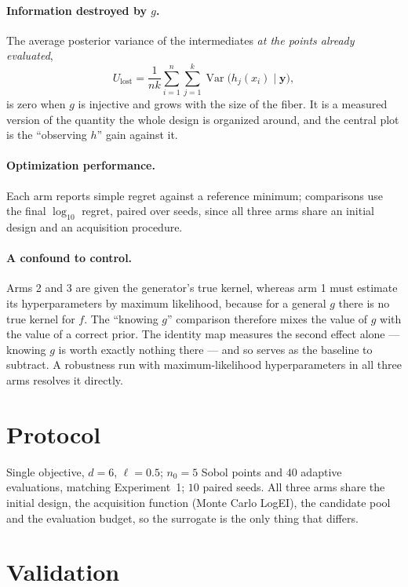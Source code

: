 \documentclass[11pt]{article}
\begin{document}
\paragraph{Information destroyed by $g$.} The average posterior variance of the
intermediates \emph{at the points already evaluated},
\begin{equation}
U_{\text{lost}}=\frac{1}{nk}\sum_{i=1}^{n}\sum_{j=1}^{k}
\operatorname{Var}\bigl(h_j(x_i)\mid \mathbf{y}\bigr),
\end{equation}
is zero when $g$ is injective and grows with the size of the fiber. It is a
measured version of the quantity the whole design is organized around, and the
central plot is the ``observing $h$'' gain against it.

\paragraph{Optimization performance.} Each arm reports simple regret against a
reference minimum; comparisons use the final $\log_{10}$ regret, paired over
seeds, since all three arms share an initial design and an acquisition
procedure.

\paragraph{A confound to control.} Arms 2 and 3 are given the generator's true
kernel, whereas arm 1 must estimate its hyperparameters by maximum likelihood,
because for a general $g$ there is no true kernel for $f$. The ``knowing $g$''
comparison therefore mixes the value of $g$ with the value of a correct prior.
The identity map measures the second effect alone --- knowing $g$ is worth
exactly nothing there --- and so serves as the baseline to subtract. A
robustness run with maximum-likelihood hyperparameters in all three arms
resolves it directly.

\section{Protocol}

Single objective, $d=6$, $\ell=0.5$; $n_0=5$ Sobol points and $40$ adaptive
evaluations, matching Experiment~1; $10$ paired seeds. All three arms share the
initial design, the acquisition function (Monte Carlo LogEI), the candidate pool
and the evaluation budget, so the surrogate is the only thing that differs.

\section{Validation}
\label{sec:validation}
\end{document}
